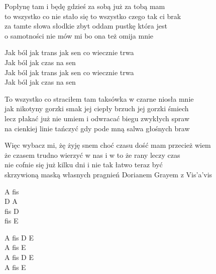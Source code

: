 \begin{text}
    \small{
    Popłynę tam i będę gdzieś za sobą już za tobą mam\\
    to wszystko co nie stało się to wszystko czego tak ci brak\\
    za tamte słowa słodkie zbyt oddam pustkę która jest\\
    o samotności nie mów mi bo ona też omija mnie

    Jak ból jak trans jak sen co wiecznie trwa\\
    Jak ból jak czas na sen\\
    Jak ból jak trans jak sen co wiecznie trwa\\
    Jak ból jak czas na sen

    To wszystko co straciłem tam taksówka w czarne niosła mnie\\
    jak nikotyny gorzki smak jej ciepły brzuch jej gorzki śmiech\\
    lecz płakać już nie umiem i odwracać biegu zwykłych spraw\\
    na cienkiej linie tańczyć gdy pode mną salwa głośnych braw

    Więc wybacz mi, żę żyję snem choć czasu dość mam przecież wiem\\
    że czasem trudno wierzyć w nas i w to że rany leczy czas\\
    nie cofnie się już kilku dni i nie tak łatwo teraz być\\
    skrzywioną maską własnych pragnień Dorianem Grayem z Vis'a'vis
    }
\end{text}
\begin{chord}
    \small{
    A fis\\
    D A\\
    fis D\\
    fis E

    A fis D E\\
    A fis E\\
    A fis D E\\
    A fis E
    }
\end{chord}